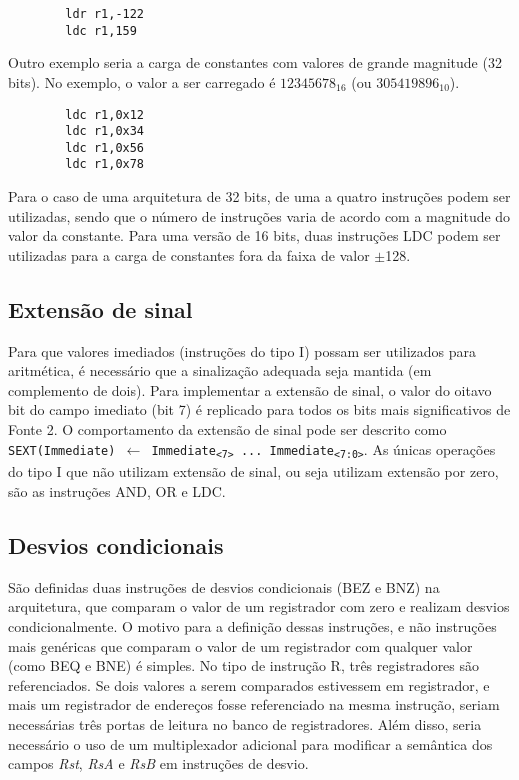 \documentclass{extreport}
\begin{document}
\begin{verbatim}
        ldr r1,-122
        ldc r1,159
\end{verbatim}

Outro exemplo seria a carga de constantes com valores de grande magnitude (32 bits). No exemplo, o valor a ser carregado é $12345678_{16}$ (ou $305419896_{10}$).

\begin{verbatim}
        ldc r1,0x12
        ldc r1,0x34
        ldc r1,0x56
        ldc r1,0x78
\end{verbatim}

Para o caso de uma arquitetura de 32 bits, de uma a quatro instruções podem ser utilizadas, sendo que o número de instruções varia de acordo com a magnitude do valor da constante. Para uma versão de 16 bits, duas instruções LDC podem ser utilizadas para a carga de constantes fora da faixa de valor $\pm$128.

\subsection{Extensão de sinal}
\label{ref:sign_ext}
Para que valores imediados (instruções do tipo I) possam ser utilizados para aritmética, é necessário que a sinalização adequada seja mantida (em complemento de dois). Para implementar a extensão de sinal, o valor do oitavo bit do campo imediato (bit 7) é replicado para todos os bits mais significativos de Fonte 2. O comportamento da extensão de sinal pode ser descrito como \texttt{SEXT(Immediate) $\leftarrow$ Immediate\textsubscript{<7>} ... Immediate\textsubscript{<7:0>}}. As únicas operações do tipo I que não utilizam extensão de sinal, ou seja utilizam extensão por zero, são as instruções AND, OR e LDC.

\subsection{Desvios condicionais}
São definidas duas instruções de desvios condicionais (BEZ e BNZ) na arquitetura, que comparam o valor de um registrador com zero e realizam desvios condicionalmente. O motivo para a definição dessas instruções, e não instruções mais genéricas que comparam o valor de um registrador com qualquer valor (como BEQ e BNE) é simples. No tipo de instrução R, três registradores são referenciados. Se dois valores a serem comparados estivessem em registrador, e mais um registrador de endereços fosse referenciado na mesma instrução, seriam necessárias três portas de leitura no banco de registradores. Além disso, seria necessário o uso de um multiplexador adicional para modificar a semântica dos campos \textit{Rst}, \textit{RsA} e \textit{RsB} em instruções de desvio.
\end{document}
